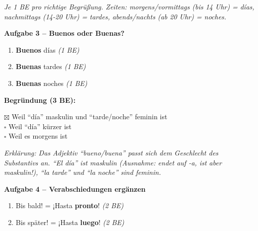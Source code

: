 \documentclass[11pt, a4paper]{article}
\newcommand{\punktebox}[1]{\hfill\fbox{\small \_\_\_/#1}}
\newcommand{\lsg}[1]{\textcolor{loesung}{\textbf{#1}}}
\begin{document}
\vspace{5pt}
\textit{Je 1 BE pro richtige Begrüßung. Zeiten: morgens/vormittags (bis 14 Uhr) = días, nachmittags (14-20 Uhr) = tardes, abends/nachts (ab 20 Uhr) = noches.}

\vspace{15pt}


\noindent\textbf{\textcolor{spanisch}{Aufgabe 3 -- Buenos oder Buenas?}} \punktebox{6}

\vspace{10pt}

\begin{enumerate}[label=\alph*)]
    \item \lsg{Buenos} días \hfill \textit{(1 BE)}
    \item \lsg{Buenas} tardes \hfill \textit{(1 BE)}
    \item \lsg{Buenas} noches \hfill \textit{(1 BE)}
\end{enumerate}

\vspace{10pt}

\noindent \textbf{Begründung (3 BE):}

\vspace{5pt}

\noindent
\lsg{$\boxtimes$} Weil ``día'' maskulin und ``tarde/noche'' feminin ist \\
$\square$ Weil ``día'' kürzer ist \\
$\square$ Weil es morgens ist

\vspace{5pt}
\textit{Erklärung: Das Adjektiv ``bueno/buena'' passt sich dem Geschlecht des Substantivs an. ``El día'' ist maskulin (Ausnahme: endet auf -a, ist aber maskulin!), ``la tarde'' und ``la noche'' sind feminin.}

\vspace{15pt}


\noindent\textbf{\textcolor{spanisch}{Aufgabe 4 -- Verabschiedungen ergänzen}} \punktebox{4}

\vspace{10pt}

\begin{enumerate}[label=\alph*)]
    \item Bis bald! = ¡Hasta \lsg{pronto}! \hfill \textit{(2 BE)}
    \item Bis später! = ¡Hasta \lsg{luego}! \hfill \textit{(2 BE)}
\end{enumerate}
\end{document}
